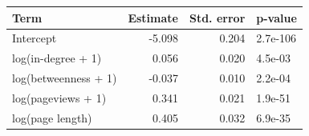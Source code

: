 
\begin{tabular}{lrrl}
\toprule
Term & Estimate & Std. error & p-value\\
\midrule
Intercept & -5.098 & 0.204 & 2.7e-106\\
log(in-degree + 1) & 0.056 & 0.020 & 4.5e-03\\
log(betweenness + 1) & -0.037 & 0.010 & 2.2e-04\\
log(pageviews + 1) & 0.341 & 0.021 & 1.9e-51\\
log(page length) & 0.405 & 0.032 & 6.9e-35\\
\bottomrule
\end{tabular}
